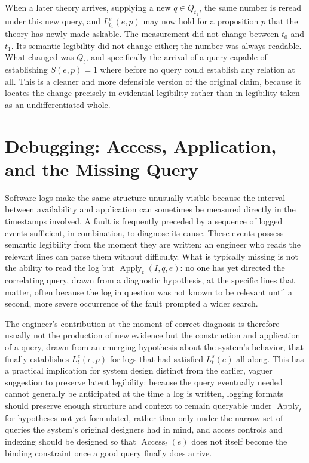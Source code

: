 \documentclass[11pt]{article}
\begin{document}
When a later theory arrives, supplying a new $q \in Q_{t_1}$, the same number is reread under this new query, and $L^e_{t_1}(e,p)$ may now hold for a proposition $p$ that the theory has newly made askable. The measurement did not change between $t_0$ and $t_1$. Its semantic legibility did not change either; the number was always readable. What changed was $Q_t$, and specifically the arrival of a query capable of establishing $S(e,p)=1$ where before no query could establish any relation at all. This is a cleaner and more defensible version of the original claim, because it locates the change precisely in evidential legibility rather than in legibility taken as an undifferentiated whole.

\section{Debugging: Access, Application, and the Missing Query}

Software logs make the same structure unusually visible because the interval between availability and application can sometimes be measured directly in the timestamps involved. A fault is frequently preceded by a sequence of logged events sufficient, in combination, to diagnose its cause. These events possess semantic legibility from the moment they are written: an engineer who reads the relevant lines can parse them without difficulty. What is typically missing is not the ability to read the log but $\operatorname{Apply}_t(I, q, e)$: no one has yet directed the correlating query, drawn from a diagnostic hypothesis, at the specific lines that matter, often because the log in question was not known to be relevant until a second, more severe occurrence of the fault prompted a wider search.

The engineer's contribution at the moment of correct diagnosis is therefore usually not the production of new evidence but the construction and application of a query, drawn from an emerging hypothesis about the system's behavior, that finally establishes $L^e_t(e,p)$ for logs that had satisfied $L^s_t(e)$ all along. This has a practical implication for system design distinct from the earlier, vaguer suggestion to preserve latent legibility: because the query eventually needed cannot generally be anticipated at the time a log is written, logging formats should preserve enough structure and context to remain queryable under $\operatorname{Apply}_t$ for hypotheses not yet formulated, rather than only under the narrow set of queries the system's original designers had in mind, and access controls and indexing should be designed so that $\operatorname{Access}_t(e)$ does not itself become the binding constraint once a good query finally does arrive.
\end{document}
